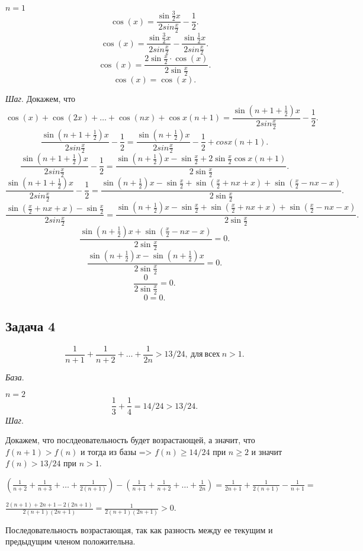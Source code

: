 	$ n = 1$
	\[
		\cos(x) = \frac{\sin\frac{3}{2}x}{2sin\frac{x}{2}} - \frac{1}{2}.
	\]
	\[
		\cos(x) = \frac{\sin\frac{3}{2}x}{2sin\frac{x}{2}} - \frac{\sin\frac{1}{2}x}{2sin\frac{x}{2}}.
	\]
	\[
		\cos(x) = \frac{2\sin\frac{x}{2} \cdot \cos(x)} {2\sin\frac{x}{2}}.
	\]
	\[
		\cos(x) = \cos(x).
	\]
	
	\textit{Шаг}.
	Докажем, что
	\[
		\cos(x) + \cos(2x) + \dots + \cos(nx) + \cos x(n+1) = \frac{\sin(n+1+\frac{1}{2})x}{2sin\frac{x}{2}} - \frac{1}{2}.
	\]
	\[
		\frac{\sin(n+1+\frac{1}{2})x}{2sin\frac{x}{2}} - \frac{1}{2} = \frac{\sin(n+\frac{1}{2})x}{2sin\frac{x}{2}} - \frac{1}{2} + cos x(n + 1).
	\]
	\[
		\frac{\sin(n+1+\frac{1}{2})x}{2sin\frac{x}{2}} - \frac{1}{2} = \frac{\sin(n+\frac{1}{2})x - \sin \frac{x}{2} + 2\sin \frac{x}{2}\cos x(n+1)}{2\sin \frac{x}{2}}.
	\]
	\[
		\frac{\sin(n+1+\frac{1}{2})x}{2sin\frac{x}{2}} - \frac{1}{2} = \frac{\sin(n+\frac{1}{2})x - \sin \frac{x}{2} + \sin(\frac{x}{2} + nx + x) + \sin(\frac{x}{2} - nx - x)}{2\sin \frac{x}{2}}.
	\]
	\[
		\frac{\sin(\frac{x}{2} + nx + x) - \sin \frac{x}{2}}{2sin\frac{x}{2}} = \frac{\sin(n+\frac{1}{2})x - \sin \frac{x}{2} + \sin(\frac{x}{2} + nx + x) + \sin(\frac{x}{2} - nx - x)}{2\sin \frac{x}{2}}.
	\]
	\[
		\frac{\sin(n+\frac{1}{2})x + \sin(\frac{x}{2} - nx - x)}{2\sin \frac{x}{2}} = 0.
	\]
	\[
		\frac{\sin(n+\frac{1}{2})x - \sin(n+\frac{1}{2})x}{2\sin \frac{x}{2}} = 0.
	\]
	\[
		\frac{0}{2\sin \frac{x}{2}} = 0.
	\]
	\[
		0 = 0.
	\]
	
\subsection{Задача 4}
	\[
		\frac{1}{n + 1} + \frac{1}{n + 2} + \dots + \frac{1}{2n} > 13/24,\  для\  всех\  n > 1.
	\]

	\textit{База}.
	
	$ n = 2$
	\[
		\frac{1}{3} + \frac{1}{4} = 14/24 > 13/24.
	\]
	\textit{Шаг}.
	
	Докажем, что послдеовательность будет возрастающей, а значит, что $f(n + 1) > f(n)$ и тогда из базы => $f(n) \ge 14/24$ при $n \ge 2$ и значит $f(n) > 13/24$ при $n > 1$.
	
	$\left(\frac{1}{n + 2} + \frac{1}{n + 3} + \dots + \frac{1}{2(n+1)}\right) - \left(\frac{1}{n + 1} + \frac{1}{n + 2} + \dots + \frac{1}{2n}\right) = \frac{1}{2n+1} + \frac{1}{2(n+1)} - \frac{1}{n+1} =$
	
	$\frac{2(n+1)+2n+1-2(2n+1)}{2(n+1)(2n+1)} = \frac{1}{2(n+1)(2n+1)} > 0$.
	
	Последовательность возрастающая, так как разность между ее текущим и предыдущим членом положительна.
	
